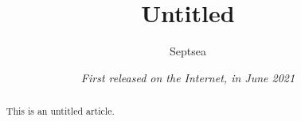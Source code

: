 \documentclass[UTF8,fontset=none,twoside,leqno,a4paper]{ctexart}
\providecommand{\newsection}{}
\renewcommand{\newsection}{\cleardoublepage \thispagestyle{empty}}
\begin{document}

\title{\sffamily Untitled}
\date{\sffamily \itshape First released on the Internet, in June 2021}
\author{\sffamily Septsea}
\pagestyle{plain}
\renewcommand{\contentsname}{Table of Contents}
\renewcommand{\abstractname}{Abstract}

\maketitle
\thispagestyle{empty}
\begin{abstract}
    This is an untitled article.
\end{abstract}
\tableofcontents


\newsection


\newsection
\pagestyle{headings}
\setcounter{page}{1}


\cleardoublepage
\thispagestyle{empty}
\end{document}
